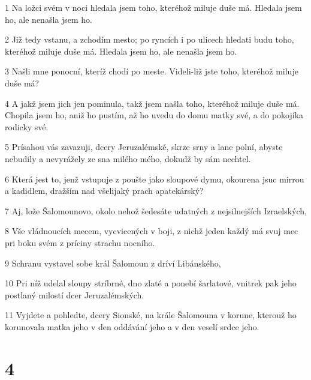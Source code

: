 \par 1 Na ložci svém v noci hledala jsem toho, kteréhož miluje duše má. Hledala jsem ho, ale nenašla jsem ho.
\par 2 Již tedy vstanu, a zchodím mesto; po ryncích i po ulicech hledati budu toho, kteréhož miluje duše má. Hledala jsem ho, ale nenašla jsem ho.
\par 3 Našli mne ponocní, kteríž chodí po meste. Videli-liž jste toho, kteréhož miluje duše má?
\par 4 A jakž jsem jich jen pominula, takž jsem našla toho, kteréhož miluje duše má. Chopila jsem ho, aniž ho pustím, až ho uvedu do domu matky své, a do pokojíka rodicky své.
\par 5 Prísahou vás zavazuji, dcery Jeruzalémské, skrze srny a lane polní, abyste nebudily a nevyrážely ze sna milého mého, dokudž by sám nechtel.
\par 6 Která jest to, jenž vstupuje z poušte jako sloupové dymu, okourena jsuc mirrou a kadidlem, dražším nad všelijaký prach apatekárský?
\par 7 Aj, lože Šalomounovo, okolo nehož šedesáte udatných z nejsilnejších Izraelských,
\par 8 Vše vládnoucích mecem, vycvicených v boji, z nichž jeden každý má svuj mec pri boku svém z príciny strachu nocního.
\par 9 Schranu vystavel sobe král Šalomoun z dríví Libánského,
\par 10 Pri níž udelal sloupy stríbrné, dno zlaté a ponebí šarlatové, vnitrek pak jeho postlaný milostí dcer Jeruzalémských.
\par 11 Vyjdete a pohledte, dcery Sionské, na krále Šalomouna v korune, kterouž ho korunovala matka jeho v den oddávání jeho a v den veselí srdce jeho.

\chapter{4}

